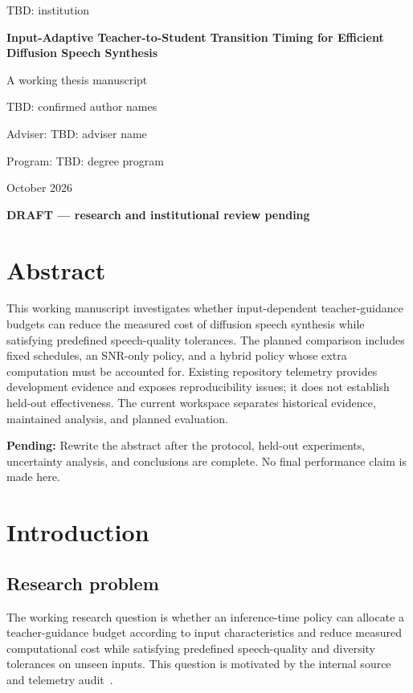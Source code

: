 \documentclass[12pt,a4paper,oneside]{report}
\newcommand{\pending}[1]{\par\noindent\textbf{Pending:} #1\par}
\newcommand{\thesistitle}{Input-Adaptive Teacher-to-Student Transition Timing for Efficient Diffusion Speech Synthesis}
\newcommand{\thesisauthors}{TBD: confirmed author names}
\newcommand{\thesisadviser}{TBD: adviser name}
\newcommand{\thesisinstitution}{TBD: institution}
\newcommand{\thesisprogram}{TBD: degree program}
\newcommand{\thesisdate}{October 2026}
\begin{document}
\begin{titlepage}
\centering
{\Large\thesisinstitution\par}
\vspace{1.8cm}
{\LARGE\bfseries\thesistitle\par}
\vspace{1.3cm}
{\large A working thesis manuscript\par}
\vspace{1cm}
{\large\thesisauthors\par}
\vfill
Adviser: \thesisadviser\par
Program: \thesisprogram\par
\vspace{0.7cm}
\thesisdate\par
\vspace{0.5cm}
\textbf{DRAFT --- research and institutional review pending}
\end{titlepage}
\chapter*{Abstract}
This working manuscript investigates whether input-dependent teacher-guidance budgets can reduce the measured cost of diffusion speech synthesis while satisfying predefined speech-quality tolerances. The planned comparison includes fixed schedules, an SNR-only policy, and a hybrid policy whose extra computation must be accounted for. Existing repository telemetry provides development evidence and exposes reproducibility issues; it does not establish held-out effectiveness. The current workspace separates historical evidence, maintained analysis, and planned evaluation.
\pending{Rewrite the abstract after the protocol, held-out experiments, uncertainty analysis, and conclusions are complete. No final performance claim is made here.}
\tableofcontents
\listoftables
\listoffigures
\clearpage
{}
\chapter{Introduction}
\label{ch:introduction}
\section{Research problem}
The working research question is whether an inference-time policy can allocate a teacher-guidance budget according to input characteristics and reduce measured computational cost while satisfying predefined speech-quality and diversity tolerances on unseen inputs. This question is motivated by the internal source and telemetry audit~\cite{internal-audit-2026}.
\end{document}
